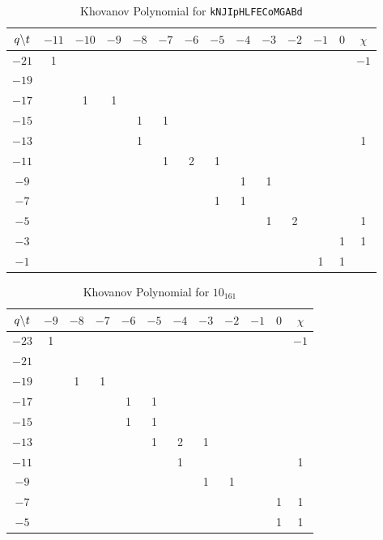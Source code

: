 \documentclass{article}
\theoremstyle{plain}
\begin{document}
        \begin{table}
            \centering
            \begin{tabular}{| c | c | c | c | c | c | c | c | c | c | c | c | c | c |}
                \hline
                $q\symbol{92}t$&$-11$&$-10$&$-9$&$-8$&$-7$&$-6$&$-5$&$-4$&$-3$&$-2$&$-1$&$0$&$\chi$\\
                \hline
                $-21$&1&&&&&&&&&&&&$-1$\\
                \hline
                $-19$&&&&&&&&&&&&&\\
                \hline
                $-17$&&1&1&&&&&&&&&&\\
                \hline
                $-15$&&&&1&1&&&&&&&&\\
                \hline
                $-13$&&&&1&&&&&&&&&1\\
                \hline
                $-11$&&&&&1&2&1&&&&&&\\
                \hline
                $-9$&&&&&&&&1&1&&&&\\
                \hline
                $-7$&&&&&&&1&1&&&&&\\
                \hline
                $-5$&&&&&&&&&1&2&&&1\\
                \hline
                $-3$&&&&&&&&&&&&1&1\\
                \hline
                $-1$&&&&&&&&&&&1&1&\\
                \hline
            \end{tabular}
            \caption{Khovanov Polynomial for \texttt{kNJIpHLFECoMGABd}}
        \end{table}
        \begin{table}
            \centering
            \begin{tabular}{| c | c | c | c | c | c | c | c | c | c | c | c |}
                \hline
                $q\symbol{92}t$&$-9$&$-8$&$-7$&$-6$&$-5$&$-4$&$-3$&$-2$&$-1$&$0$&$\chi$\\
                \hline
                $-23$&1&&&&&&&&&&$-1$\\
                \hline
                $-21$&&&&&&&&&&&\\
                \hline
                $-19$&&1&1&&&&&&&&\\
                \hline
                $-17$&&&&1&1&&&&&&\\
                \hline
                $-15$&&&&1&1&&&&&&\\
                \hline
                $-13$&&&&&1&2&1&&&&\\
                \hline
                $-11$&&&&&&1&&&&&1\\
                \hline
                $-9$&&&&&&&1&1&&&\\
                \hline
                $-7$&&&&&&&&&&1&1\\
                \hline
                $-5$&&&&&&&&&&1&1\\
                \hline
            \end{tabular}
            \caption{Khovanov Polynomial for $10_{161}$}
        \end{table}
\end{document}
